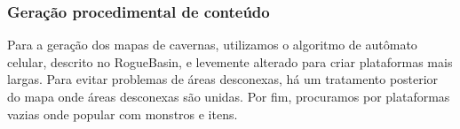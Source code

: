     
    \subsubsection{Geração procedimental de conteúdo}
      Para a geração dos mapas de cavernas, utilizamos o algoritmo de autômato celular, descrito no RogueBasin,
      \cite{roguebasin:cellularautomata} e levemente alterado para criar plataformas mais largas. Para
      evitar problemas de áreas desconexas, há um tratamento posterior do mapa onde áreas desconexas são unidas.
      Por fim, procuramos por plataformas vazias onde popular com monstros e itens.
